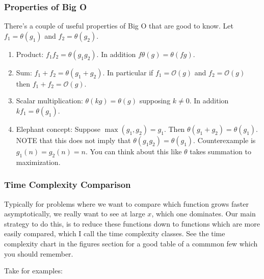 \subsubsection{Properties of Big O}

There's a couple of useful properties of Big O that are good to know. Let $f_1 =
\theta(g_1)$ and $f_2 = \theta(g_2)$.

\begin{enumerate}[(1)]

\item Product: $f_1f_2 = \theta(g_1g_2)$. In addition $f \theta(g) =
\theta(fg)$.

\item Sum: $f_1 + f_2 = \theta(g_1 + g_2)$. In particular if $f_1 =
\mathcal{O}(g)$ and $f_2 = \mathcal{O}(g)$ then $f_1+f_2 = \mathcal{O}(g)$.

\item Scalar multiplication: $\theta(kg) = \theta(g)$ supposing $k \neq 0$. In
addition $kf_1 = \theta(g_1)$.

\item Elephant concept: Suppose $\max(g_1, g_2) = g_1$. Then $\theta(g_1 + g_2)
= \theta(g_1)$. NOTE that this does not imply that $\theta(g_1g_2) =
\theta(g_1)$. Counterexample is $g_1(n) = g_2(n) = n$. You can think about this
like $\theta$ takes summation to maximization.

\end{enumerate}

\subsubsection{Time Complexity Comparison}

Typically for problems where we want to compare which function grows faster
asymptotically, we really want to see at large $x$, which one dominates. Our
main strategy to do this, is to reduce these functions down to functions which
are more easily compared, which I call the time complexity classes. See the time
complexity chart in the figures section for a good table of a commmon few which
you should remember. 

Take for examples:

